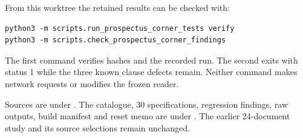 From this worktree the retained results can be checked with:
\begin{lstlisting}
python3 -m scripts.run_prospectus_corner_tests verify
python3 -m scripts.check_prospectus_corner_findings
\end{lstlisting}
The first command verifies hashes and the recorded run. The second exits
with status 1 while the three known clause defects remain. Neither command
makes network requests or modifies the frozen reader.

Sources are under .
The catalogue, 30 specifications, regression findings, raw outputs, build
manifest and reset memo are under
.
The earlier 24-document study and its source selections remain unchanged.
